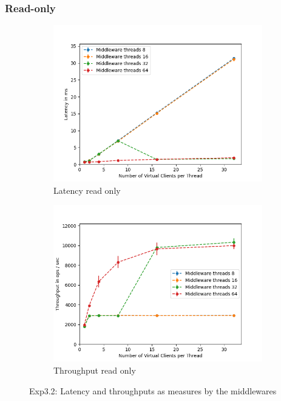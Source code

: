\documentclass[11pt,a4paper]{article}
\begin{document}
\subsubsection{Read-only}

\begin{figure}[H]
\centering
\begin{subfigure}{.5\textwidth}
    \centering
    \includegraphics[width=\textwidth]{img/exp3_2/exp3_2__latency_middleware_write_0.png}
    \caption{Latency read only}
    \label{fig:mesh1}
\end{subfigure}%
\begin{subfigure}{.5\textwidth}
      \centering
    \includegraphics[width=\textwidth]{img/exp3_2/exp3_2__throughput_middleware_write_0.png}
    \caption{Throughput read only}
    \label{fig:mesh1}
\end{subfigure}
\caption{Exp3.2: Latency and throughputs as measures by the middlewares}
\label{fig:test}
\end{figure}
\end{document}
